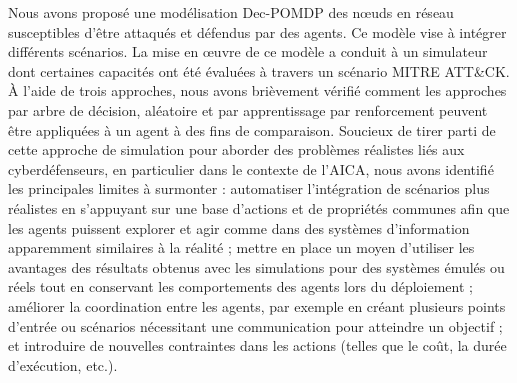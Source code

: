 \noindent Nous avons proposé une modélisation Dec-POMDP des nœuds en réseau susceptibles d'être attaqués et défendus par des agents. Ce modèle vise à intégrer différents scénarios. La mise en œuvre de ce modèle a conduit à un simulateur dont certaines capacités ont été évaluées à travers un scénario MITRE ATT\&CK. À l'aide de trois approches, nous avons brièvement vérifié comment les approches par arbre de décision, aléatoire et par apprentissage par renforcement peuvent être appliquées à un agent à des fins de comparaison.
Soucieux de tirer parti de cette approche de simulation pour aborder des problèmes réalistes liés aux cyberdéfenseurs, en particulier dans le contexte de l'AICA, nous avons identifié les principales limites à surmonter :
automatiser l'intégration de scénarios plus réalistes en s'appuyant sur une base d'actions et de propriétés communes afin que les agents puissent explorer et agir comme dans des systèmes d'information apparemment similaires à la réalité ;
mettre en place un moyen d'utiliser les avantages des résultats obtenus avec les simulations pour des systèmes émulés ou réels tout en conservant les comportements des agents lors du déploiement ;
améliorer la coordination entre les agents, par exemple en créant plusieurs points d'entrée ou scénarios nécessitant une communication pour atteindre un objectif ;
et introduire de nouvelles contraintes dans les actions (telles que le coût, la durée d'exécution, etc.).
